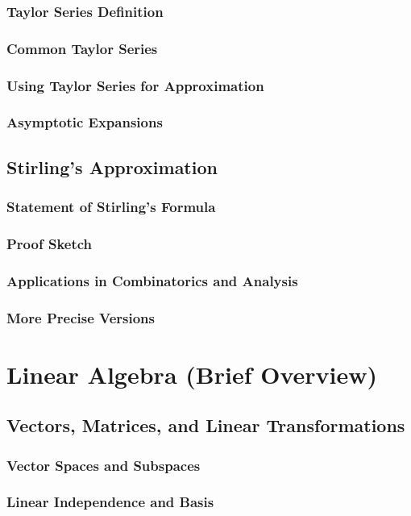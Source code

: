 \subsubsection{Taylor Series Definition}
\subsubsection{Common Taylor Series}
\subsubsection{Using Taylor Series for Approximation}
\subsubsection{Asymptotic Expansions}

\subsection{Stirling's Approximation}
\subsubsection{Statement of Stirling's Formula}
\subsubsection{Proof Sketch}
\subsubsection{Applications in Combinatorics and Analysis}
\subsubsection{More Precise Versions}

\section{Linear Algebra (Brief Overview)}
\subsection{Vectors, Matrices, and Linear Transformations}
\subsubsection{Vector Spaces and Subspaces}
\subsubsection{Linear Independence and Basis}

